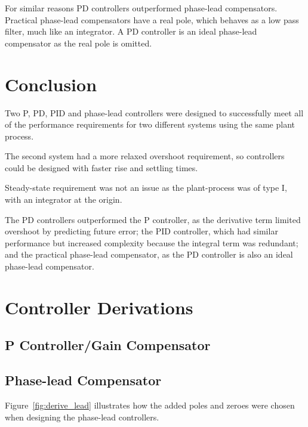 \documentclass[a4paper,10pt,twocolumn]{article}
\begin{document}
For similar reasons PD controllers outperformed phase-lead compensators. Practical phase-lead compensators have a real pole, which behaves as a low pass filter, much like an integrator. A PD controller is an ideal phase-lead compensator as the real pole is omitted.

\section{Conclusion}

Two P, PD, PID and phase-lead controllers were designed to successfully meet all of the performance requirements for two different systems using the same plant process.

The second system had a more relaxed overshoot requirement, so controllers could be designed with faster rise and settling times.

Steady-state requirement was not an issue as the plant-process was of type I, with an integrator at the origin.

The PD controllers outperformed the P controller, as the derivative term limited overshoot by predicting future error; the PID controller, which had similar performance but increased complexity because the integral term was redundant; and the practical phase-lead compensator, as the PD controller is also an ideal phase-lead compensator.

\printbibliography

\appendix
\onecolumn

\section{Controller Derivations} \label{app:derive}

\subsection{P Controller/Gain Compensator}

\subsection{Phase-lead Compensator} \label{app:lead}

Figure~\ref{fig:derive_lead} illustrates how the added poles and zeroes were chosen when designing the phase-lead controllers.
\end{document}
